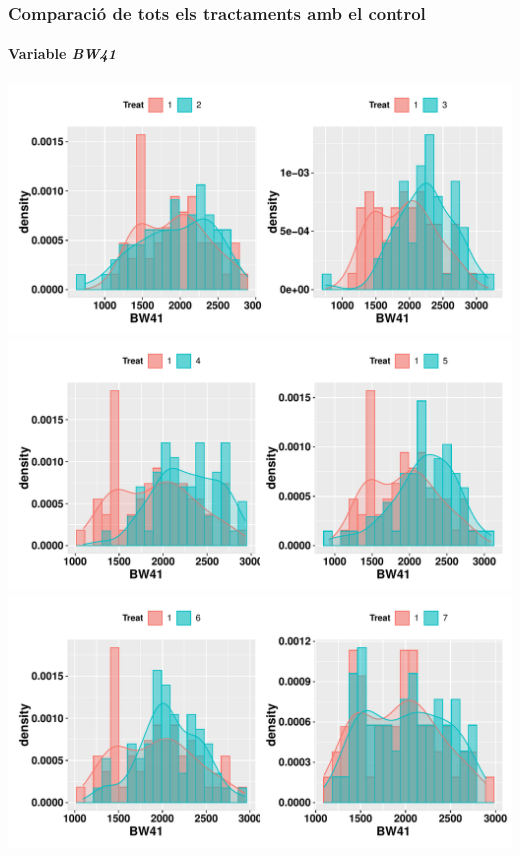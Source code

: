 \documentclass[
  11pt,
]{article}
\begin{document}
\hypertarget{comparaciuxf3-de-tots-els-tractaments-amb-el-control}{%
\subsubsection{Comparació de tots els tractaments amb el
control}\label{comparaciuxf3-de-tots-els-tractaments-amb-el-control}}

\hypertarget{variable-bw41}{%
\paragraph{\texorpdfstring{Variable
\emph{BW41}}{Variable BW41}}\label{variable-bw41}}

\includegraphics{def_files/figure-latex/unnamed-chunk-12-1.pdf}
\includegraphics{def_files/figure-latex/unnamed-chunk-12-2.pdf}
\includegraphics{def_files/figure-latex/unnamed-chunk-12-3.pdf}
\end{document}
